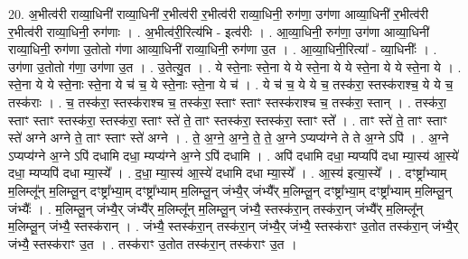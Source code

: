 \documentclass[17pt]{extarticle}
\begin{document}
20. अ॒भीत्व॑री राव्या॒धिनी॑ राव्या॒धिनी॑ र॒भीत्व॑री र॒भीत्व॑री राव्या॒धिनी॒ रुग॑णा॒ उग॑णा आव्या॒धिनी॑ र॒भीत्व॑री र॒भीत्व॑री राव्या॒धिनी॒ रुग॑णाः । . अ॒भीत्व॑री॒रित्य॑भि - इत्व॑रीः । . आ॒व्या॒धिनी॒ रुग॑णा॒ उग॑णा आव्या॒धिनी॑ राव्या॒धिनी॒ रुग॑णा उ॒तोतो ग॑णा आव्या॒धिनी॑ राव्या॒धिनी॒ रुग॑णा उ॒त । . आ॒व्या॒धिनी॒रित्या᳚ - व्या॒धिनीः᳚ । . उग॑णा उ॒तोतो ग॑णा॒ उग॑णा उ॒त । . उ॒तेत्यु॒त । . ये स्ते॒नाः स्ते॒ना ये ये स्ते॒ना ये ये स्ते॒ना ये ये स्ते॒ना ये । . स्ते॒ना ये ये स्ते॒नाः स्ते॒ना ये च॑ च॒ ये स्ते॒नाः स्ते॒ना ये च॑ । . ये च॑ च॒ ये ये च॒ तस्क॑रा॒ स्तस्क॑राश्च॒ ये ये च॒ तस्क॑राः । . च॒ तस्क॑रा॒ स्तस्क॑राश्च च॒ तस्क॑रा॒ स्ताꣳ स्ताꣳ स्तस्क॑राश्च च॒ तस्क॑रा॒ स्तान् । . तस्क॑रा॒ स्ताꣳ स्ताꣳ स्तस्क॑रा॒ स्तस्क॑रा॒ स्ताꣳ स्ते॑ ते॒ ताꣳ स्तस्क॑रा॒ स्तस्क॑रा॒ स्ताꣳ स्ते᳚ । . ताꣳ स्ते॑ ते॒ ताꣳ स्ताꣳ स्ते॑ अग्ने अग्ने ते॒ ताꣳ स्ताꣳ स्ते॑ अग्ने । . ते॒ अ॒ग्ने॒ अ॒ग्ने॒ ते॒ ते॒ अ॒ग्ने ऽप्यप्य॑ग्ने ते ते अ॒ग्ने ऽपि॑ । . अ॒ग्ने ऽप्यप्य॑ग्ने अ॒ग्ने ऽपि॑ दधामि दधा॒ म्यप्य॑ग्ने अ॒ग्ने ऽपि॑ दधामि । . अपि॑ दधामि दधा॒ म्यप्यपि॑ दधा म्या॒स्य॑ आ॒स्ये॑ दधा॒ म्यप्यपि॑ दधा म्या॒स्ये᳚ । . द॒धा॒ म्या॒स्य॑ आ॒स्ये॑ दधामि दधा म्या॒स्ये᳚ । . आ॒स्य॑ इत्या॒स्ये᳚ । . दꣳष्ट्रा᳚भ्याम् म॒लिम्लू᳚न् म॒लिम्लू॒न् दꣳष्ट्रा᳚भ्या॒म् दꣳष्ट्रा᳚भ्याम् म॒लिम्लू॒न् जंभ्यै॒र् जंभ्यै᳚र् म॒लिम्लू॒न् दꣳष्ट्रा᳚भ्या॒म् दꣳष्ट्रा᳚भ्याम् म॒लिम्लू॒न् जंभ्यैः᳚ । . म॒लिम्लू॒न् जंभ्यै॒र् जंभ्यै᳚र् म॒लिम्लू᳚न् म॒लिम्लू॒न् जंभ्यै॒ स्तस्क॑रा॒न् तस्क॑रा॒न् जंभ्यै᳚र् म॒लिम्लू᳚न् म॒लिम्लू॒न् जंभ्यै॒ स्तस्क॑रान् । . जंभ्यै॒ स्तस्क॑रा॒न् तस्क॑रा॒न् जंभ्यै॒र् जंभ्यै॒ स्तस्क॑राꣳ उ॒तोत तस्क॑रा॒न् जंभ्यै॒र् जंभ्यै॒ स्तस्क॑राꣳ उ॒त । . तस्क॑राꣳ उ॒तोत तस्क॑रा॒न् तस्क॑राꣳ उ॒त । \newline
\end{document}
